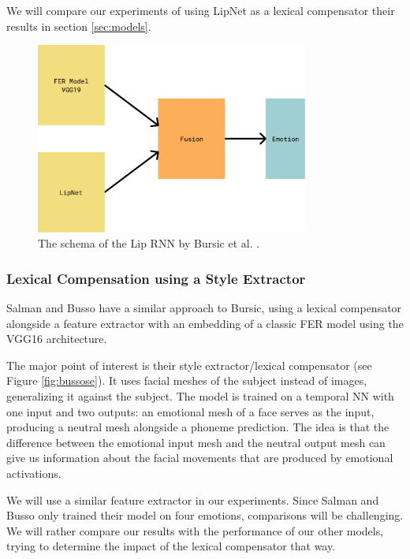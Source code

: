 We will compare our experiments of using LipNet as a lexical compensator their results in section \ref{sec:models}.

\begin{figure}
    \centering
    \includegraphics[width=0.8\textwidth]{res/bursicschema.pdf}
    \caption{The schema of the Lip RNN by Bursic et al. \cite{bursic2020improving}.}
    \label{fig:bursic_schema}
\end{figure}

\subsubsection{Lexical Compensation using a Style Extractor}
Salman and Busso \cite{salman2020style} have a similar approach to Bursic, using a lexical compensator alongside a feature extractor with an embedding of a classic FER model using the VGG16 architecture.

The major point of interest is their style extractor/lexical compensator (see Figure \ref{fig:bussose}). It uses facial meshes of the subject instead of images, generalizing it against the subject. The model is trained on a temporal NN with one input and two outputs: an emotional mesh of a face serves as the input, producing a neutral mesh alongside a phoneme prediction. The idea is that the difference between the emotional input mesh and the neutral output mesh can give us information about the facial movements that are produced by emotional activations.

We will use a similar feature extractor in our experiments. Since Salman and Busso only trained their model on four emotions, comparisons will be challenging. We will rather compare our results with the performance of our other models, trying to determine the impact of the lexical compensator that way. 

